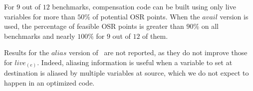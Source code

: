 For $9$ out of $12$ benchmarks, compensation code can be built using only live variables for more than $50\%$ of potential OSR points.
When the $avail$ version is used, the percentage of feasible OSR points is greater than $90\%$ on all benchmarks and nearly $100\%$ for $9$ out of $12$ of them.

Results for the $alias$ version of \reconstruct\ are not reported, as they do not improve those for $live_{(e)}$. Indeed, aliasing information is useful when a variable to set at destination is aliased by multiple variables at source, which we do not expect to happen in an optimized code.
